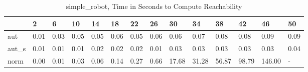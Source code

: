 \begin{table}
\caption{simple_robot, Time in Seconds to Compute Reachability}
\label{simple_robot_states_time}
\begin{tabular}{llllllllllllll}
\toprule
 & 2 & 6 & 10 & 14 & 18 & 22 & 26 & 30 & 34 & 38 & 42 & 46 & 50 \\
\midrule
aut & 0.01 & 0.03 & 0.05 & 0.05 & 0.06 & 0.05 & 0.06 & 0.06 & 0.07 & 0.08 & 0.08 & 0.09 & 0.09 \\
aut_s & 0.01 & 0.01 & 0.01 & 0.02 & 0.02 & 0.02 & 0.01 & 0.03 & 0.03 & 0.03 & 0.03 & 0.03 & 0.04 \\
norm & 0.00 & 0.01 & 0.03 & 0.06 & 0.14 & 0.27 & 0.66 & 17.68 & 31.28 & 56.87 & 98.79 & 146.00 & - \\
\bottomrule
\end{tabular}
\end{table}
